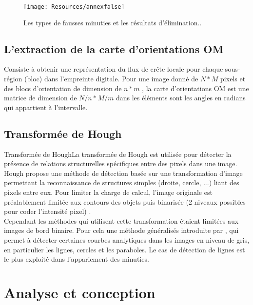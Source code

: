 \begin{center}
	\begin{figure}[H]
		\centering
		\texttt{[image: Resources/annexfalse]}
		\captionsetup{justification=centering}
		\caption{Les types de fausses minuties et les résultats d'élimination.\citep{maltoni2009handbook}.}
		\label{fig:annexfalse}
	\end{figure}
\end{center}
 
\section{L'extraction de la carte d'orientations OM }
\label{carteOM}
Consiste à obtenir une représentation du flux de crête locale pour chaque sous-région (bloc) dans l'empreinte digitale. Pour une image donné de $ N*M $ pixels et des blocs d'orientation de dimension de $ n*m $ , la carte d'orientations OM est une matrice de dimension de $  N/n * M/m $ dans les éléments sont les angles en radians qui appartient à l'intervalle. 

\section{Transformée de Hough}
\label{Hough}
Transformée de HoughLa transformée de Hough est utilisée pour détecter la présence de relations structurelles spécifiques entre des pixels dans une image. Hough propose une méthode de détection basée sur une transformation d’image permettant la reconnaissance de structures simples (droite, cercle, ...) liant des pixels entre eux. Pour limiter la charge de calcul, l’image originale est préalablement limitée aux contours des objets puis binarisée (2 niveaux possibles pour coder l’intensité pixel) \citep{bergounioux2008quelques}.\\
Cependant les méthodes qui utilisent cette transformation étaient limitées aux images de bord binaire. Pour cela une méthode généralisés introduite par \citep{bergounioux2008quelques}, qui permet à détecter certaines courbes analytiques dans les images en niveau de gris, en particulier les lignes, cercles et les paraboles. Le cas de détection de lignes est le plus exploité dans l’appariement des minuties.
\chapter{Analyse et conception}
